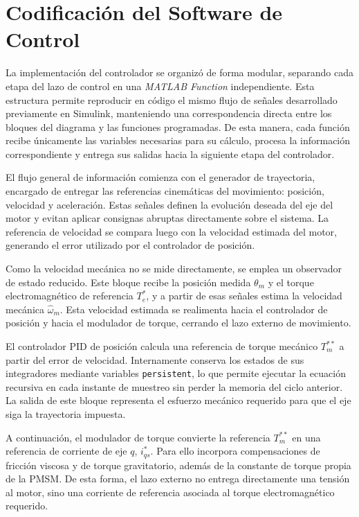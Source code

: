 \documentclass[12pt, a4paper,journal, onecolumn, compsoc]{IEEEtran}
\begin{document}
\section{Codificación del Software de Control}

La implementación del controlador se organizó de forma modular, separando cada etapa del lazo de control en una \textit{MATLAB Function} independiente. Esta estructura permite reproducir en código el mismo flujo de señales desarrollado previamente en Simulink, manteniendo una correspondencia directa entre los bloques del diagrama y las funciones programadas. De esta manera, cada función recibe únicamente las variables necesarias para su cálculo, procesa la información correspondiente y entrega sus salidas hacia la siguiente etapa del controlador.

El flujo general de información comienza con el generador de trayectoria, encargado de entregar las referencias cinemáticas del movimiento: posición, velocidad y aceleración. Estas señales definen la evolución deseada del eje del motor y evitan aplicar consignas abruptas directamente sobre el sistema. La referencia de velocidad se compara luego con la velocidad estimada del motor, generando el error utilizado por el controlador de posición.

Como la velocidad mecánica no se mide directamente, se emplea un observador de estado reducido. Este bloque recibe la posición medida $\theta_m$ y el torque electromagnético de referencia $T_e^{*}$, y a partir de esas señales estima la velocidad mecánica $\hat{\omega}_m$. Esta velocidad estimada se realimenta hacia el controlador de posición y hacia el modulador de torque, cerrando el lazo externo de movimiento.

El controlador PID de posición calcula una referencia de torque mecánico $T_m^{**}$ a partir del error de velocidad. Internamente conserva los estados de sus integradores mediante variables \texttt{persistent}, lo que permite ejecutar la ecuación recursiva en cada instante de muestreo sin perder la memoria del ciclo anterior. La salida de este bloque representa el esfuerzo mecánico requerido para que el eje siga la trayectoria impuesta.

A continuación, el modulador de torque convierte la referencia $T_m^{**}$ en una referencia de corriente de eje $q$, $i_{qs}^{*}$. Para ello incorpora compensaciones de fricción viscosa y de torque gravitatorio, además de la constante de torque propia de la PMSM. De esta forma, el lazo externo no entrega directamente una tensión al motor, sino una corriente de referencia asociada al torque electromagnético requerido.
\end{document}
